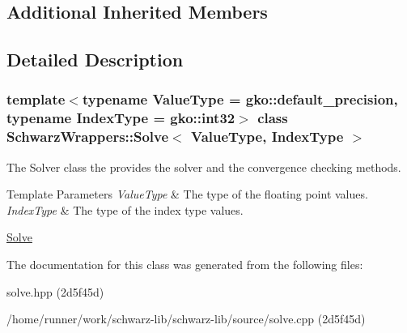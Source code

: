 \subsection*{Additional Inherited Members}


\subsection{Detailed Description}
\subsubsection*{template$<$typename Value\+Type = gko\+::default\+\_\+precision, typename Index\+Type = gko\+::int32$>$\newline
class Schwarz\+Wrappers\+::\+Solve$<$ Value\+Type, Index\+Type $>$}

The Solver class the provides the solver and the convergence checking methods. 


\begin{DoxyTemplParams}{Template Parameters}
{\em Value\+Type} & The type of the floating point values. \\
\hline
{\em Index\+Type} & The type of the index type values.\\
\hline
\end{DoxyTemplParams}
\hyperlink{group__solve}{Solve} 

The documentation for this class was generated from the following files\+:\begin{DoxyCompactItemize}
\item 
solve.\+hpp (2d5f45d)\item 
/home/runner/work/schwarz-\/lib/schwarz-\/lib/source/solve.\+cpp (2d5f45d)\end{DoxyCompactItemize}
